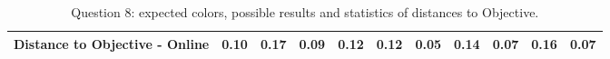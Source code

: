 \begin{table}[H]
{\begin{tabular}{lccccccccccccc}
    \multicolumn{4}{l}{Distance to Objective - Online}                                                                                               & \multicolumn{1}{|c}{0.10}        & \multicolumn{1}{c|}{0.17}    & \multicolumn{1}{|c}{\textbf{0.09}}        & \multicolumn{1}{c|}{0.12}    & \multicolumn{1}{|c}{0.12}       & \multicolumn{1}{c|}{0.05}    & \multicolumn{1}{|c}{0.14}        & \multicolumn{1}{c|}{0.07}    & \multicolumn{1}{|c}{0.16}       & \multicolumn{1}{c|}{0.07}    \\ \hline
    \end{tabular}}
  \caption[Question 8, with expected Results.]{Question 8: expected colors, possible results and statistics of distances to Objective.}
  \vspace{-5pt}
  \label{table:lab_q8_expected}
\end{table}
%
